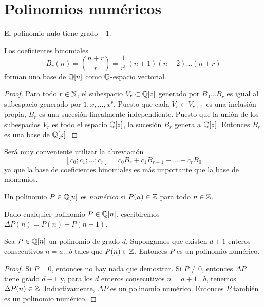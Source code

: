 \section{Polinomios numéricos}

\begin{preliminaries}
El polinomio nulo tiene grado $-1$.
\end{preliminaries}

\begin{proposition}
Los coeficientes binomiales
$$B_r(n) = \binom {n+r} r = \frac 1 {r!} \, (n+1) (n+2) \dots (n+r)$$
forman una base de $\mathbb Q[n]$ como $\mathbb Q$-espacio vectorial.
\end{proposition}

\begin{proof}
Para todo $r \in \mathbb N$, el subespacio $V_r \subset \mathbb Q[z]$ generado por $B_0 \dots B_r$ es igual al subespacio generado por $1, x, \dots, x^r$. Puesto que cada $V_r \subset V_{r+1}$ es una inclusión propia, $B_r$ es una sucesión linealmente independiente. Puesto que la unión de los subespacios $V_r$ es todo el espacio $\mathbb Q[z]$, la sucesión $B_r$ genera a $\mathbb Q[z]$. Entonces $B_r$ es una base de $\mathbb Q[z]$.
\end{proof}

\begin{notation}
Será muy conveniente utilizar la abreviación
$$[c_0; c_1; \dots; c_r] = c_0 B_r + c_1 B_{r-1} + \dots + c_r B_0$$
ya que la base de coeficientes binomiales es más importante que la base de monomios.
\end{notation}

\begin{definition}
Un polinomio $P \in \mathbb Q[n]$ es \textit{numérico} si $P(n) \in \mathbb Z$ para todo $n \in \mathbb Z$.
\end{definition}

\begin{notation}
Dado cualquier polinomio $P \in \mathbb Q[n]$, escribiremos $\Delta P(n) = P(n) - P(n-1)$.
\end{notation}

\begin{proposition}
Sea $P \in \mathbb Q[n]$ un polinomio de grado $d$. Supongamos que existen $d+1$ enteros consecutivos $n = a \dots b$ tales que $P(n) \in \mathbb Z$. Entonces $P$ es un polinomio numérico.
\end{proposition}

\begin{proof}
Si $P = 0$, entonces no hay nada que demostrar. Si $P \ne 0$, entonces $\Delta P$ tiene grado $d-1$ y, para los $d$ enteros consecutivos $n = a+1 \dots b$, tenemos $\Delta P(n) \in \mathbb Z$. Inductivamente, $\Delta P$ es un polinomio numérico. Entonces $P$ también es un polinomio numérico.
\end{proof}

